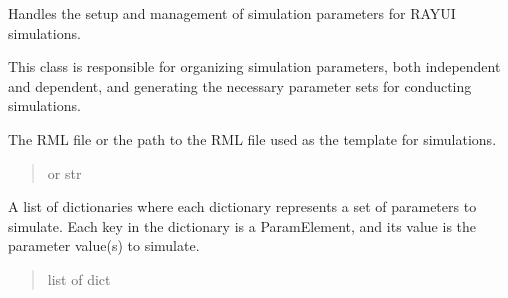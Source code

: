\documentclass[letterpaper,10pt,english]{sphinxmanual}
\begin{document}
\begin{fulllineitems}
\label{\detokenize{API:raypyng.simulate.SimulationParams}}
\pysigstartsignatures
\pysiglinewithargsret
{}
{\sphinxparamcomma {}\sphinxparamcomma {}}
{}
\pysigstopsignatures
\sphinxAtStartPar
Handles the setup and management of simulation parameters for RAY\sphinxhyphen{}UI simulations.

\sphinxAtStartPar
This class is responsible for organizing simulation parameters, both independent and dependent,
and generating the necessary parameter sets for conducting simulations.

\begin{fulllineitems}
\label{\detokenize{API:raypyng.simulate.SimulationParams.rml}}
\pysigstartsignatures
\pysigline
{}
\pysigstopsignatures
\sphinxAtStartPar
The RML file or the path to the RML file used as the template
for simulations.
\begin{quote}\begin{description}
\sphinxAtStartPar
{\hyperref[\detokenize{API:raypyng.rml.RMLFile}]{}} or str

\end{description}\end{quote}

\end{fulllineitems}


\begin{fulllineitems}
\label{\detokenize{API:raypyng.simulate.SimulationParams.params}}
\pysigstartsignatures
\pysigline
{}
\pysigstopsignatures
\sphinxAtStartPar
A list of dictionaries where each dictionary represents a
set of parameters to simulate. Each key in the dictionary
is a ParamElement, and its value is the parameter value(s)
to simulate.
\begin{quote}\begin{description}
\sphinxAtStartPar
list of dict


\end{description}
\end{quote}
\end{fulllineitems}
\end{fulllineitems}
\end{document}
